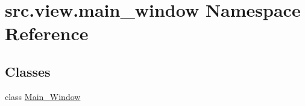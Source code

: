 \hypertarget{namespacesrc_1_1view_1_1main__window}{}\section{src.\+view.\+main\+\_\+window Namespace Reference}
\label{namespacesrc_1_1view_1_1main__window}
\subsection*{Classes}
\begin{DoxyCompactItemize}
\item 
class \hyperlink{classsrc_1_1view_1_1main__window_1_1Main__Window}{Main\+\_\+\+Window}
\end{DoxyCompactItemize}
